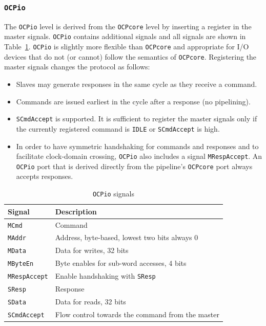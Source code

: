\documentclass[a4paper,fontsize=10pt,twoside,DIV15,BCOR12mm,headinclude=true,footinclude=false,pagesize,bibtotoc]{scrbook}
\newcommand{\code}[1]{{\texttt{#1}}}
\begin{document}
\subsubsection{\code{OCPio}}

The \code{OCPio} level is derived from the \code{OCPcore} level by
inserting a register in the master signals. \code{OCPio} contains
additional signals and all signals are shown in Table~\ref{tab:ocpiosignals}.
\code{OCPio} is slightly more
flexible than \code{OCPcore} and appropriate for I/O devices that do
not (or cannot) follow the semantics of \code{OCPcore}. Registering
the master signals changes the protocol as follows:
\begin{itemize}
\item Slaves may generate responses in the same cycle as they
  receive a command.
\item Commands are issued earliest in the cycle after a response (no
  pipelining).
\item \code{SCmdAccept} is supported. It is sufficient to register the
  master signals only if the currently registered command is
  \code{IDLE} or \code{SCmdAccept} is high.
\item In order to have symmetric handshaking for commands and
  responses and to facilitate clock-domain crossing, \code{OCPio} also
  includes a signal \code{MRespAccept}. An \code{OCPio} port that is
  derived directly from the pipeline's \code{OCPcore} port always
  accepts responses.
\end{itemize}

\begin{table}
  \centering
  \caption{\code{OCPio} signals}
  \label{tab:ocpiosignals}
  \begin{tabular}{ll}
    \toprule
    Signal & Description \\
    \midrule
    \code{MCmd} & Command \\
    \code{MAddr} & Address, byte-based, lowest two bits always 0 \\
    \code{MData} & Data for writes, 32 bits \\
    \code{MByteEn} & Byte enables for sub-word accesses, 4 bits \\
    \code{MRespAccept} & Enable handshaking with \code{SResp} \\
    \cmidrule{1-2}
    \code{SResp} & Response \\
    \code{SData} & Data for reads, 32 bits \\
    \code{SCmdAccept} & Flow control towards the command from the master \\
    \bottomrule
  \end{tabular}
\end{table}
\end{document}
